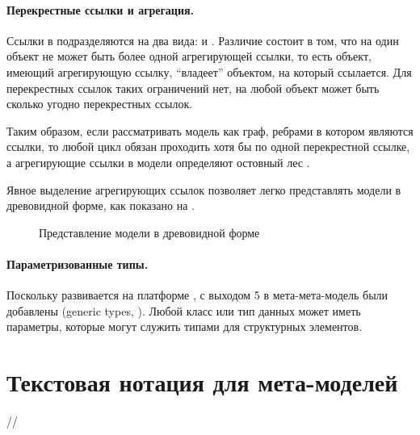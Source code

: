 \paragraph*{Перекрестные ссылки и агрегация.} Ссылки в  подразделяются на два вида:  и . Различие состоит в том, что на один объект не может быть более одной агрегирующей ссылки, то есть объект, имеющий агрегирующую ссылку, ``владеет'' объектом, на который ссылается. Для перекрестных ссылок таких ограничений нет, на любой объект может быть сколько угодно перекрестных ссылок.

Таким образом, если рассматривать модель как граф, ребрами в котором являются ссылки, то любой цикл обязан проходить хотя бы по одной перекрестной ссылке, а агрегирующие ссылки в модели определяют остовный лес \cite{cormen01introduction}.

Явное выделение агрегирующих ссылок позволяет легко представлять модели в древовидной форме, как показано на .

\begin{figure}[htbp]
\centering
\caption{Представление модели в древовидной форме}\label{ModelTree}
\end{figure}

\paragraph*{Параметризованные типы.} Поскольку  развивается на платформе , с выходом  5 в мета-мета-модель были добавлены  (generic types, \cite{GJ}). Любой класс или тип данных может иметь параметры, которые могут служить типами для структурных элементов.

\section{Текстовая нотация для мета-моделей}
//
